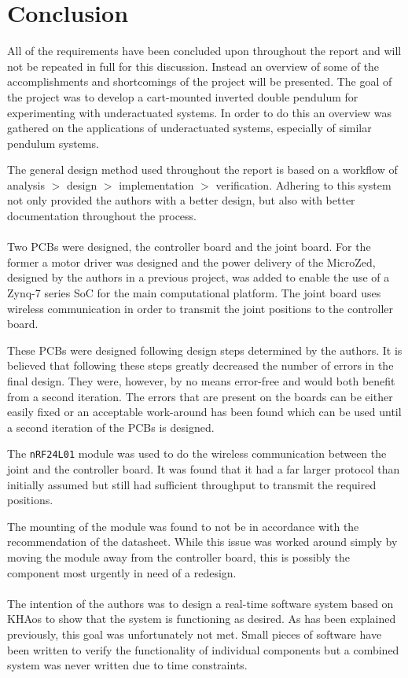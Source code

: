 \section{Conclusion} %
\label{sub:conclusion}
All of the requirements have been concluded upon throughout the report and  will not be repeated in full for this discussion.
Instead an overview of some of the accomplishments and shortcomings of the project will be presented.
The goal of the project was to develop a cart-mounted inverted double pendulum for experimenting with underactuated systems.
In order to do this an overview was gathered on the applications of underactuated systems, especially of similar pendulum systems.

The general design method used throughout the report is based on a workflow of analysis $>$ design $>$ implementation $>$ verification.
Adhering to this system not only provided the authors with a better design, but also with better documentation throughout the process.
\\~\\
Two PCBs were designed, the controller board and the joint board.
For the former a motor driver was designed and the power delivery of the MicroZed, designed by the authors in a previous project, was added to enable the use of a Zynq-7 series SoC for the main computational platform.
The joint board uses wireless communication in order to transmit the joint positions to the controller board.

These PCBs were designed following design steps determined by the authors.
It is believed that following these steps greatly decreased the number of errors in the final design.
They were, however, by no means error-free and would both benefit from a second iteration.
The errors that are present on the boards can be either easily fixed or an acceptable work-around has been found which can be used until a second iteration of the PCBs is designed.

The \texttt{nRF24L01} module was used to do the wireless communication between the joint and the controller board.
It was found that it had a far larger protocol than initially assumed but still had sufficient throughput to transmit the required positions.

The mounting of the module was found to not be in accordance with the recommendation of the datasheet.
While this issue was worked around simply by moving the module away from the controller board, this is possibly the component most urgently in need of a redesign.
\\~\\
The intention of the authors was to design a real-time software system based on KHAos to show that the system is functioning as desired.
As has been explained previously, this goal was unfortunately not met.
Small pieces of software have been written to verify the functionality of individual components but a combined system was never written due to time constraints.


